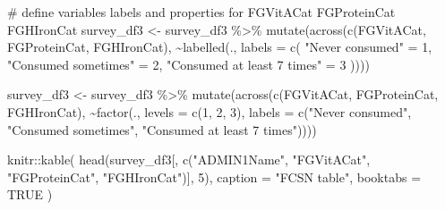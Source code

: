 \documentclass[
  letterpaper,
  DIV=11,
  numbers=noendperiod]{scrreprt}
\newenvironment{Shaded}{\begin{snugshade}}{\end{snugshade}}
\newcommand{\AttributeTok}[1]{\textcolor[rgb]{0.40,0.45,0.13}{#1}}
\newcommand{\CommentTok}[1]{\textcolor[rgb]{0.37,0.37,0.37}{#1}}
\newcommand{\ConstantTok}[1]{\textcolor[rgb]{0.56,0.35,0.01}{#1}}
\newcommand{\DecValTok}[1]{\textcolor[rgb]{0.68,0.00,0.00}{#1}}
\newcommand{\FunctionTok}[1]{\textcolor[rgb]{0.28,0.35,0.67}{#1}}
\newcommand{\NormalTok}[1]{\textcolor[rgb]{0.00,0.23,0.31}{#1}}
\newcommand{\OtherTok}[1]{\textcolor[rgb]{0.00,0.23,0.31}{#1}}
\newcommand{\SpecialCharTok}[1]{\textcolor[rgb]{0.37,0.37,0.37}{#1}}
\newcommand{\StringTok}[1]{\textcolor[rgb]{0.13,0.47,0.30}{#1}}
\begin{document}
\begin{Shaded}
\begin{Highlighting}[]
\CommentTok{\# define variables labels and properties for FGVitACat FGProteinCat FGHIronCat}
\NormalTok{survey\_df3 }\OtherTok{\textless{}{-}}\NormalTok{ survey\_df3 }\SpecialCharTok{\%\textgreater{}\%}
  \FunctionTok{mutate}\NormalTok{(}\FunctionTok{across}\NormalTok{(}\FunctionTok{c}\NormalTok{(FGVitACat, FGProteinCat, FGHIronCat), }
                \SpecialCharTok{\textasciitilde{}}\FunctionTok{labelled}\NormalTok{(., }\AttributeTok{labels =} \FunctionTok{c}\NormalTok{(}
                  \StringTok{"Never consumed"} \OtherTok{=} \DecValTok{1}\NormalTok{,}
                  \StringTok{"Consumed sometimes"} \OtherTok{=} \DecValTok{2}\NormalTok{,}
                  \StringTok{"Consumed at least 7 times"} \OtherTok{=} \DecValTok{3}
\NormalTok{                ))))}

\NormalTok{survey\_df3 }\OtherTok{\textless{}{-}}\NormalTok{ survey\_df3 }\SpecialCharTok{\%\textgreater{}\%}
  \FunctionTok{mutate}\NormalTok{(}\FunctionTok{across}\NormalTok{(}\FunctionTok{c}\NormalTok{(FGVitACat, FGProteinCat, FGHIronCat),}
                \SpecialCharTok{\textasciitilde{}}\FunctionTok{factor}\NormalTok{(., }\AttributeTok{levels =} \FunctionTok{c}\NormalTok{(}\DecValTok{1}\NormalTok{, }\DecValTok{2}\NormalTok{, }\DecValTok{3}\NormalTok{),}
                        \AttributeTok{labels =} \FunctionTok{c}\NormalTok{(}\StringTok{"Never consumed"}\NormalTok{, }\StringTok{"Consumed sometimes"}\NormalTok{, }
                                   \StringTok{"Consumed at least 7 times"}\NormalTok{))))}
\end{Highlighting}
\end{Shaded}

\begin{Shaded}
\begin{Highlighting}[]
\NormalTok{knitr}\SpecialCharTok{::}\FunctionTok{kable}\NormalTok{(}
  \FunctionTok{head}\NormalTok{(survey\_df3[, }\FunctionTok{c}\NormalTok{(}\StringTok{"ADMIN1Name"}\NormalTok{, }\StringTok{"FGVitACat"}\NormalTok{, }\StringTok{"FGProteinCat"}\NormalTok{, }\StringTok{"FGHIronCat"}\NormalTok{)], }\DecValTok{5}\NormalTok{),}
  \AttributeTok{caption =} \StringTok{"FCSN table"}\NormalTok{,}
  \AttributeTok{booktabs =} \ConstantTok{TRUE}
\NormalTok{)}
\end{Highlighting}
\end{Shaded}
\end{document}
